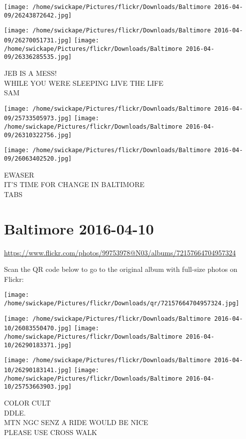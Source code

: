 \documentclass[10pt,letterpaper]{article}
\begin{document}
\texttt{[image: /home/swickape/Pictures/flickr/Downloads/Baltimore 2016-04-09/26243872642.jpg]}

\vspace{0.25in}
\texttt{[image: /home/swickape/Pictures/flickr/Downloads/Baltimore 2016-04-09/26270051731.jpg]}
\texttt{[image: /home/swickape/Pictures/flickr/Downloads/Baltimore 2016-04-09/26336285535.jpg]}

JEB IS A MESS!\\
WHILE YOU WERE SLEEPING LIVE THE LIFE\\
SAM
\pagebreak

\texttt{[image: /home/swickape/Pictures/flickr/Downloads/Baltimore 2016-04-09/25733505973.jpg]}
\texttt{[image: /home/swickape/Pictures/flickr/Downloads/Baltimore 2016-04-09/26310322756.jpg]}

\texttt{[image: /home/swickape/Pictures/flickr/Downloads/Baltimore 2016-04-09/26063402520.jpg]}

EWASER\\
IT'S TIME FOR CHANGE IN BALTIMORE\\
TABS
\pagebreak

\section*{Baltimore 2016-04-10}

\url{https://www.flickr.com/photos/99753978@N03/albums/72157664704957324}

Scan the QR code below to go to the original album with full-size photos on Flickr:

\texttt{[image: /home/swickape/Pictures/flickr/Downloads/qr/72157664704957324.jpg]}
\pagebreak

\texttt{[image: /home/swickape/Pictures/flickr/Downloads/Baltimore 2016-04-10/26083550470.jpg]}
\texttt{[image: /home/swickape/Pictures/flickr/Downloads/Baltimore 2016-04-10/26290183371.jpg]}

\texttt{[image: /home/swickape/Pictures/flickr/Downloads/Baltimore 2016-04-10/26290183141.jpg]}
\texttt{[image: /home/swickape/Pictures/flickr/Downloads/Baltimore 2016-04-10/25753663903.jpg]}

COLOR CULT\\
DDLE.\\
MTN NGC SENZ A RIDE WOULD BE NICE\\
PLEASE USE CROSS WALK
\pagebreak
\end{document}
